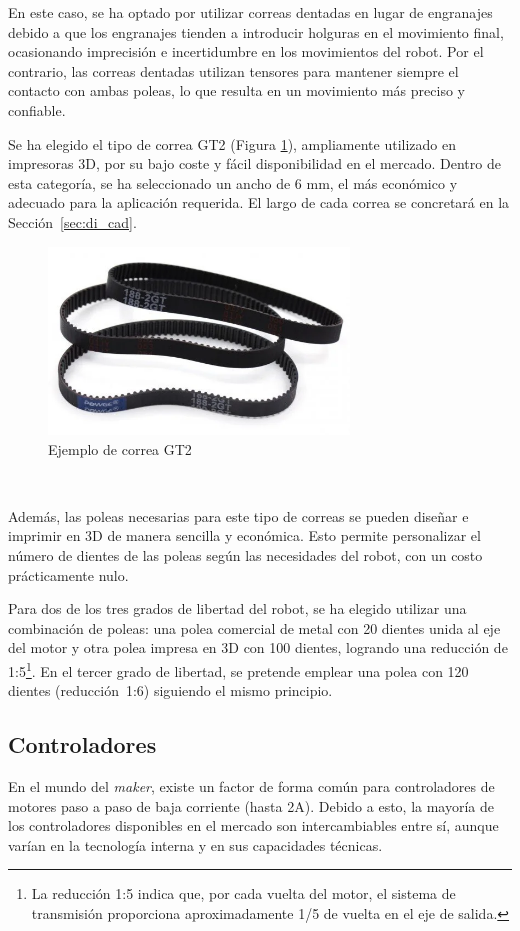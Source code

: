 En este caso, se ha optado por utilizar correas dentadas en lugar de engranajes debido a que los engranajes 
tienden a introducir holguras en el movimiento final, ocasionando imprecisión e incertidumbre en los movimientos 
del robot. Por el contrario, las correas dentadas utilizan tensores para mantener siempre el contacto con 
ambas poleas, lo que resulta en un movimiento más preciso y confiable.

Se ha elegido el tipo de correa GT2 (Figura \ref{fig:correa}), ampliamente utilizado en impresoras 3D, por su bajo coste y fácil 
disponibilidad en el mercado. Dentro de esta categoría, se ha seleccionado un ancho de 6 mm, el más 
económico y adecuado para la aplicación requerida. El largo de cada correa se concretará en la \mbox{Sección \ref{sec:di_cad}}.
\begin{figure} [ht!]
  \begin{center}
    \includegraphics[width=8cm]{figs/correa.png}
  \end{center}
  \caption{Ejemplo de correa GT2}
  \label{fig:correa}
\end{figure}\ 

Además, las poleas necesarias para este tipo de correas se pueden diseñar e imprimir en 3D de manera 
sencilla y económica. Esto permite personalizar el número de dientes de las poleas según las 
necesidades del robot, con un costo prácticamente nulo.

Para dos de los tres grados de libertad del robot, se ha elegido utilizar una combinación de poleas: una polea comercial de 
metal con 20 dientes unida al eje del motor y otra polea impresa en 3D con 100 dientes, logrando una reducción de 1:5\footnote{
  La reducción 1:5 indica que, por cada vuelta del motor, el sistema de transmisión proporciona aproximadamente 1/5 de vuelta en el eje de salida.
}. En el 
tercer grado de libertad, se pretende emplear una polea con 120 dientes \mbox{(reducción 1:6)} siguiendo el mismo principio.

\subsection{Controladores}
\noindent En el mundo del \textit{maker}, existe un factor de forma común para controladores de motores paso a paso de baja corriente (hasta 2A). Debido a esto, 
la mayoría de los controladores disponibles en el mercado son intercambiables entre sí, aunque varían en la tecnología interna y en sus 
capacidades técnicas.

